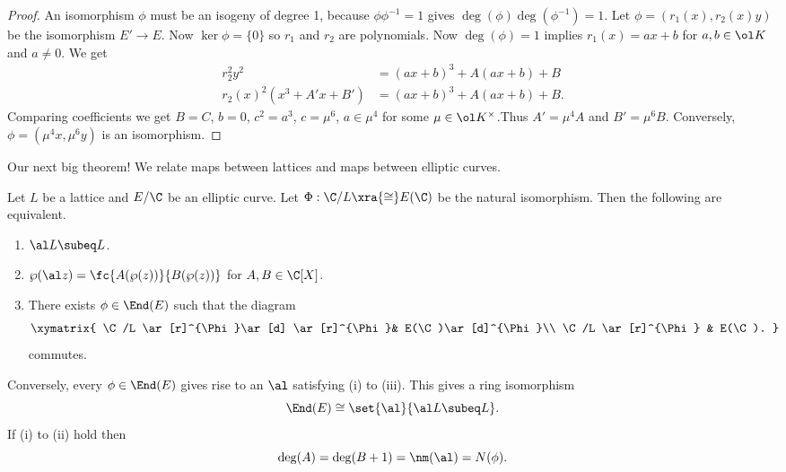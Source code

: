 \begin{proof}
An isomorphism $\phi$ must be an isogeny of degree 1, because $\phi\phi^{-1}=1$ gives $\deg(\phi)\deg(\phi^{-1})=1$. %
Let $\phi=(r_1(x),r_2(x)y)$ be the isomorphism $E'\to E$. Now $\ker\phi=\{0\}$ so $r_1$ and $r_2$ are polynomials. Now $\deg(\phi)=1$ implies $r_1(x)=ax+b$ for $a,b\in \ol K$ and $a\ne 0$. We get
\begin{align*}
r_2^2 y^2 &= (ax+b)^3+A(ax+b)+B\\
r_2(x)^2(x^3+A'x+B')&= (ax+b)^3 +A(ax+b)+B.
\end{align*}
Comparing coefficients we get $B=C$, $b=0$, $c^2=a^3$, $c=\mu^6$, $a\in \mu^4$ for some $\mu\in \ol K^{\times}$.Thus $A'=\mu^4A$ and $B'=\mu^6B$. Conversely, $\phi=(\mu^4x,\mu^6y)$ is an isomorphism.
\end{proof}
Our next big theorem! We relate maps between lattices and maps between elliptic curves.
\begin{thm}
Let $L$ be a lattice and $E/\C$ be an elliptic curve. Let $\Phi:\C/L\xra{\cong}E(\C)$ be the natural isomorphism. Then the following are equivalent.
\begin{enumerate}
\item
$\al L\subeq L$.
\item
$\wp(\al z)=\fc{A(\wp(z))}{B(\wp(z))}$ for $A,B\in \C[X]$.
\item
There exists $\phi \in \End(E)$ such that the diagram
\[
\xymatrix{
\C/L \ar[r]^{\Phi}\ar[d] \ar[r]^{\Phi}& E(\C)\ar[d]^{\Phi}\\
\C/L \ar[r]^{\Phi} & E(\C).
}
\]
commutes.
\end{enumerate}
Conversely, every  $\phi\in \End(E)$ gives rise to an $\al$ satisfying (i) to (iii). This gives a ring isomorphism
\[
\End(E)\cong \set{\al}{\al L\subeq L}.
\]
If (i) to (ii) hold then
\[
\deg(A)=\deg(B+1)=\nm(\al)=N(\phi).
\]
\end{thm}

